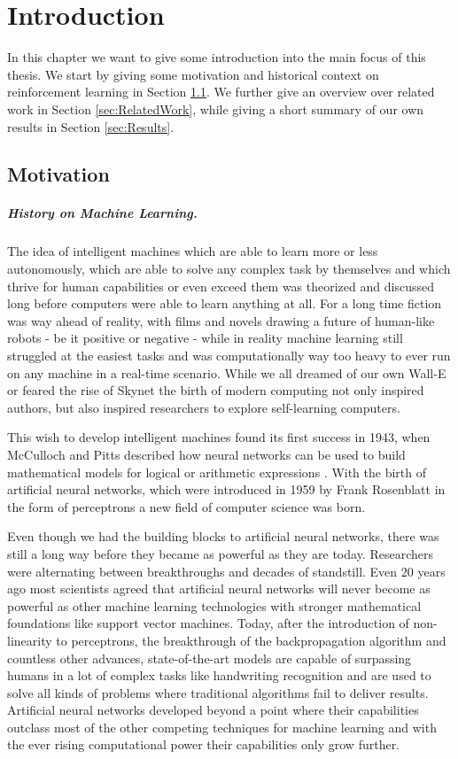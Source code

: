\chapter{Introduction} \label{chp:Introduction}
In this chapter we want to give some introduction into the main focus of this thesis. We start by giving some motivation and historical context on reinforcement learning in Section \ref{sec:Motivation}. We further give an overview over related work in Section \ref{sec:RelatedWork}, while giving a short summary of our own results in Section \ref{sec:Results}.  

\section{Motivation} \label{sec:Motivation}
\paragraph{History on Machine Learning.}
The idea of intelligent machines which are able to learn more or less autonomously, which are able to solve any complex task by themselves and which thrive for human capabilities or even exceed them was theorized and discussed long before computers were able to learn anything at all. For a long time fiction was way ahead of reality, with films and novels drawing a future of human-like robots - be it positive or negative - while in reality machine learning still struggled at the easiest tasks and was computationally way too heavy to ever run on any machine in a real-time scenario. While we all dreamed of our own Wall-E or feared the rise of Skynet the birth of modern computing not only inspired authors, but also inspired researchers to explore self-learning computers.

 This wish to develop intelligent machines found its first success in 1943, when McCulloch and Pitts described how neural networks can be used to build mathematical models for logical or arithmetic expressions \cite{mcculloch1943logical}. With the birth of artificial neural networks, which were introduced in 1959 by Frank Rosenblatt in the form of perceptrons \cite{rosenblatt1958perceptron} a new field of computer science was born.

 Even though we had the building blocks to artificial neural networks, there was still a long way before they became as powerful as they are today. Researchers were alternating between breakthroughs and decades of standstill. Even 20 years ago most scientists agreed that artificial neural networks will never become as powerful as other machine learning technologies with stronger mathematical foundations like support vector machines. Today, after the introduction of non-linearity to perceptrons, the breakthrough of the backpropagation algorithm and countless other advances, state-of-the-art models are capable of surpassing humans in a lot of complex tasks like handwriting recognition and are used to solve all kinds of problems where traditional algorithms fail to deliver results. Artificial neural networks developed beyond a point where their capabilities outclass most of the other competing techniques for machine learning and with the ever rising computational power their capabilities only grow further.

